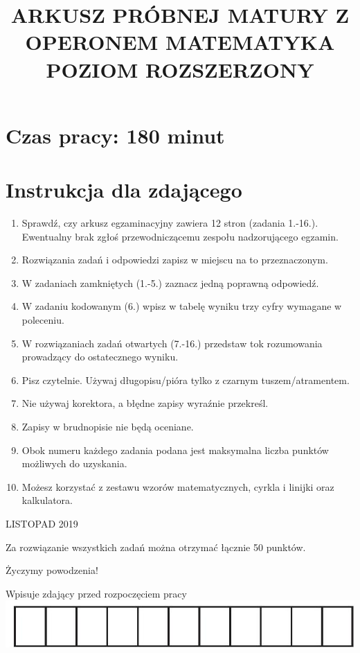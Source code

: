 \documentclass[10pt]{article}
\title{ARKUSZ PRÓBNEJ MATURY Z OPERONEM MATEMATYKA \\
 POZIOM ROZSZERZONY }
\author{}
\date{}
\begin{document}
\maketitle
\section*{Czas pracy: 180 minut}
\section*{Instrukcja dla zdającego}
\begin{enumerate}
  \item Sprawdź, czy arkusz egzaminacyjny zawiera 12 stron (zadania 1.-16.). Ewentualny brak zgłoś przewodniczącemu zespołu nadzorującego egzamin.
  \item Rozwiązania zadań i odpowiedzi zapisz w miejscu na to przeznaczonym.
  \item W zadaniach zamkniętych (1.-5.) zaznacz jedną poprawną odpowiedź.
  \item W zadaniu kodowanym (6.) wpisz w tabelę wyniku trzy cyfry wymagane w poleceniu.
  \item W rozwiązaniach zadań otwartych (7.-16.) przedstaw tok rozumowania prowadzący do ostatecznego wyniku.
  \item Pisz czytelnie. Używaj długopisu/pióra tylko z czarnym tuszem/atramentem.
  \item Nie używaj korektora, a błędne zapisy wyraźnie przekreśl.
  \item Zapisy w brudnopisie nie będą oceniane.
  \item Obok numeru każdego zadania podana jest maksymalna liczba punktów możliwych do uzyskania.
  \item Możesz korzystać z zestawu wzorów matematycznych, cyrkla i linijki oraz kalkulatora.
\end{enumerate}

LISTOPAD 2019

Za rozwiązanie wszystkich zadań można otrzymać łącznie 50 punktów.

Życzymy powodzenia!

Wpisuje zdający przed rozpoczęciem pracy\\
\includegraphics[max width=\textwidth, center]{2024_11_21_d15133c79177ee6989d3g-01}
\end{document}
